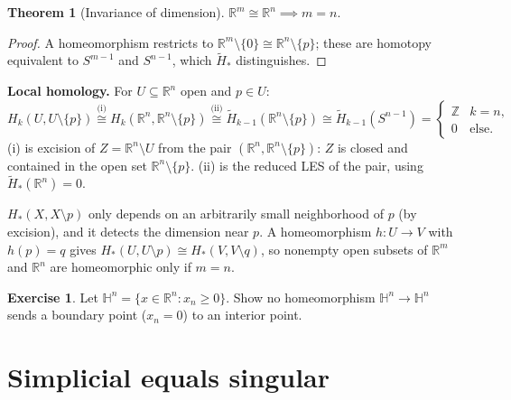 \documentclass[11pt]{article}
\newcommand{\Z}{\mathbb Z}
\newcommand{\R}{\mathbb R}
\newcommand{\Hred}{\tilde H}
\theoremstyle{definition}
\newtheorem{thm}{Theorem}[section]
\newtheorem{exercise}{Exercise}[section]
\begin{document}
\begin{thm}[Invariance of dimension]
$\R^m\cong\R^n\implies m=n$.
\end{thm}
\begin{proof}
A homeomorphism restricts to $\R^m\setminus\{0\}\cong\R^n\setminus\{p\}$; these are homotopy equivalent to $S^{m-1}$ and $S^{n-1}$, which $\Hred_*$ distinguishes.
\end{proof}

\textbf{Local homology.} For $U\subseteq\R^n$ open and $p\in U$:
\[H_k(U,U\setminus\{p\})\overset{\text{(i)}}{\cong}H_k(\R^n,\R^n\setminus\{p\})\overset{\text{(ii)}}{\cong}\Hred_{k-1}(\R^n\setminus\{p\})\cong\Hred_{k-1}(S^{n-1})=\begin{cases}\Z&k=n,\\0&\text{else.}\end{cases}\]
(i) is excision of $Z=\R^n\setminus U$ from the pair $(\R^n,\R^n\setminus\{p\})$: $Z$ is closed and contained in the open set $\R^n\setminus\{p\}$. (ii) is the reduced LES of the pair, using $\Hred_*(\R^n)=0$.
\begin{intuition}
$H_*(X,X\setminus p)$ only depends on an arbitrarily small neighborhood of $p$ (by excision), and it detects the dimension near $p$. A homeomorphism $h:U\to V$ with $h(p)=q$ gives $H_*(U,U\setminus p)\cong H_*(V,V\setminus q)$, so nonempty open subsets of $\R^m$ and $\R^n$ are homeomorphic only if $m=n$.
\end{intuition}

\begin{exercise}\label{exr:halfspace}
Let $\mathbb H^n=\{x\in\R^n:x_n\ge0\}$. Show no homeomorphism $\mathbb H^n\to\mathbb H^n$ sends a boundary point ($x_n=0$) to an interior point.
\end{exercise}

\section{Simplicial equals singular}\label{sec:delta-sing}
\end{document}
